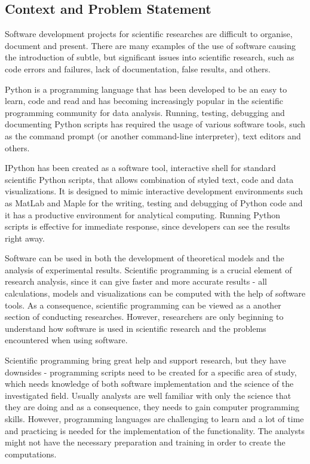 \subsection{Context and Problem Statement}
\label{problem}

Software development projects for scientific researches are difficult to organise, document and present. There are many examples of the use of software causing the introduction of subtle, but significant issues into scientific research, such as code errors and failures, lack of documentation, false results, and others. 

Python is a programming language that has been developed to be an easy to learn, code and read and has becoming increasingly popular in the scientific programming community for data analysis. Running, testing, debugging and documenting Python scripts has required the usage of various software tools, such as the command prompt (or another command-line interpreter), text editors and others. 

IPython has been created as a software tool, interactive shell for standard scientific Python scripts, that allows combination of styled text, code and data visualizations.\cite{mckinney2012python} It is designed to mimic interactive development environments such as MatLab \cite{matLab} and Maple \cite{maple} for  the writing, testing and debugging of Python code and it has a productive environment for analytical computing. \cite{mckinney2012python} Running Python scripts is effective for immediate response, since developers can see the results right away.

Software can be used in both the development of theoretical models and the analysis of experimental results. Scientific programming is a crucial element of research analysis, since it can give faster and more accurate results - all calculations, models and visualizations can be computed with the help of software tools. As a consequence, scientific programming can be viewed as a another section of conducting researches.\cite{johansson2014introduction} However, researchers are only beginning to understand how software is used in scientific research and the problems encountered when using software.

Scientific programming bring great help and support research, but they have downsides - programming scripts need to be created for a specific area of study, which needs knowledge of both software implementation and the science of the investigated field. Usually analysts are well familiar with only the science that they are doing and as a consequence, they needs to gain computer programming skills. However, programming languages are challenging to learn and a lot of time and practicing is needed for the implementation of the functionality. The analysts might not have the necessary preparation and training in order to create the computations.  


